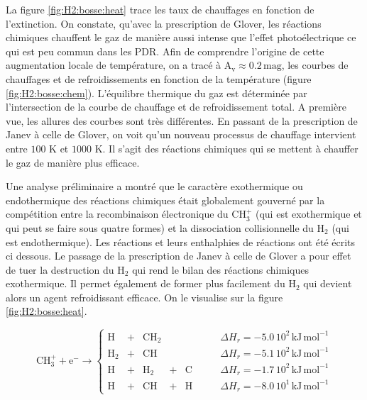 La figure \ref{fig:H2:bosse:heat} trace les taux de chauffages en fonction de l'extinction. On constate, qu'avec la prescription de Glover, les réactions chimiques chauffent le gaz de manière aussi intense que l'effet photoélectrique ce qui est peu commun dans les PDR. Afin de comprendre l'origine de cette augmentation locale de température, on a tracé à $\mathrm{A}_\mathrm{v} \approx 0.2 \,\mathrm{mag}$, les courbes de chauffages et de refroidissements en fonction de la température (figure \ref{fig:H2:bosse:chem}). L'équilibre thermique du gaz est déterminée par l'intersection de la courbe de chauffage et de refroidissement total. A première vue, les allures des courbes sont très différentes. En passant de la prescription de Janev à celle de Glover, on voit qu'un nouveau processus de chauffage intervient entre $100$ K et $1000$ K. Il s'agit des réactions chimiques qui se mettent à chauffer le gaz de manière plus efficace. \newline

Une analyse préliminaire a montré que le caractère exothermique ou endothermique des réactions chimiques était globalement gouverné par la compétition entre la recombinaison électronique du $\mathrm{CH}_3^+$ (qui est exothermique et qui peut se faire sous quatre formes) et la dissociation collisionnelle du $\mathrm{H}_2$ (qui est endothermique). Les réactions et leurs enthalphies de réactions ont été écrits ci dessous. Le passage de la prescription de Janev à celle de Glover a pour effet de tuer la destruction du $\mathrm{H}_2$ qui rend le bilan des réactions chimiques exothermique. Il permet également de former plus facilement du $\mathrm{H}_2$ qui devient alors un agent refroidissant efficace. On le visualise sur la figure \ref{fig:H2:bosse:heat}. \newline


\begin{equation}
     \mathrm{CH}_3^+ +  \mathrm{e}^- \rightarrow \left\{ 
    \begin{array}{lcccclr}
         \mathrm{H} &+& \mathrm{CH}_2  & & & \qquad \Delta H_r = - 5.0\,10^2 \,\mathrm{kJ}\,\mathrm{mol}^{-1}\\
         \mathrm{H}_2 &+& \mathrm{CH}  & & & \qquad \Delta H_r = - 5.1\,10^2 \,\mathrm{kJ}\,\mathrm{mol}^{-1}\\
         \mathrm{H} &+& \mathrm{H}_2 &+& \mathrm{C}  & \qquad \Delta H_r = - 1.7\,10^2 \,\mathrm{kJ}\,\mathrm{mol}^{-1}\\
         \mathrm{H} &+& \mathrm{CH} &+& \mathrm{H} & \qquad  \Delta H_r = - 8.0\,10^1 \,\mathrm{kJ}\,\mathrm{mol}^{-1}
    \end{array}\right.
\end{equation}


